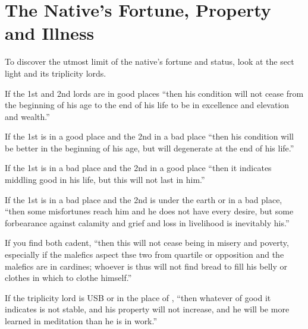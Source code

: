 \section{The Native's Fortune, Property and Illness}
To discover the utmost limit of the native's fortune and status, look at the sect light and its triplicity lords.

If the 1st and 2nd lords are in good places ``then his condition will not cease from the beginning of his age to the end of his life to be in excellence and elevation and wealth.''

If the 1st is in a good place and the 2nd in a bad place ``then his condition will be better in the beginning of his age, but will degenerate at the end of his life.''

If the 1st is in a bad place and the 2nd in a good place ``then it indicates middling good in his life, but this will not last in him.''

If the 1st is in a bad place and the 2nd is under the earth or in a bad place, ``then some misfortunes reach him and he does not have every desire, but some forbearance against calamity and grief and loss in livelihood is inevitably his.''

If you find both cadent, ``then this will not cease being in misery and poverty, especially if the malefics aspect thse two from quartile or opposition and the malefics are in cardines; whoever is thus will not find bread to fill his belly or clothes in which to clothe himself.''

If the triplicity lord is USB or in the place of \Saturn, ``then whatever of good it indicates is not stable, and his property will not increase, and he will be more learned in meditation than he is in work.''